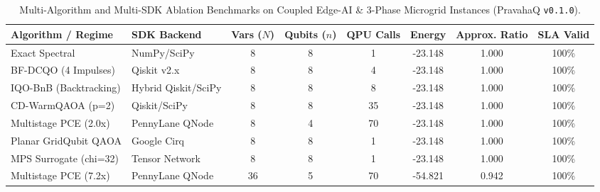 \begin{table}[t]
\centering
\caption{Multi-Algorithm and Multi-SDK Ablation Benchmarks on Coupled Edge-AI \& 3-Phase Microgrid Instances (PravahaQ \texttt{v0.1.0}).}
\label{tab:ablation}
\begin{tabular}{llcccccc}
\toprule
\textbf{Algorithm / Regime} & \textbf{SDK Backend} & \textbf{Vars ($N$)} & \textbf{Qubits ($n$)} & \textbf{QPU Calls} & \textbf{Energy} & \textbf{Approx. Ratio} & \textbf{SLA Valid} \\
\midrule
Exact Spectral & NumPy/SciPy & 8 & 8 & 1 & -23.148 & 1.000 & 100\% \\
BF-DCQO (4 Impulses) & Qiskit v2.x & 8 & 8 & 4 & -23.148 & 1.000 & 100\% \\
IQO-BnB (Backtracking) & Hybrid Qiskit/SciPy & 8 & 8 & 8 & -23.148 & 1.000 & 100\% \\
CD-WarmQAOA (p=2) & Qiskit/SciPy & 8 & 8 & 35 & -23.148 & 1.000 & 100\% \\
Multistage PCE (2.0x) & PennyLane QNode & 8 & 4 & 70 & -23.148 & 1.000 & 100\% \\
Planar GridQubit QAOA & Google Cirq & 8 & 8 & 1 & -23.148 & 1.000 & 100\% \\
MPS Surrogate (chi=32) & Tensor Network & 8 & 8 & 1 & -23.148 & 1.000 & 100\% \\
Multistage PCE (7.2x) & PennyLane QNode & 36 & 5 & 70 & -54.821 & 0.942 & 100\% \\
\bottomrule
\end{tabular}
\end{table}
